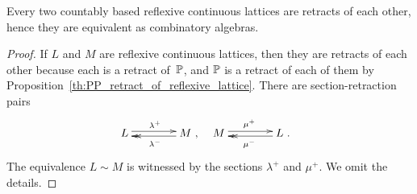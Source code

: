 \begin{corollary}
  \label{th:reflexive_lattices_equivalent}%
  Every two countably based reflexive continuous lattices are retracts 
  of each other, hence they are equivalent as combinatory algebras.
\end{corollary}

\begin{proof}
  If $L$ and $M$ are reflexive continuous lattices, then they are
  retracts of each other because each is a retract of~$\mathbb{P}$, and $\mathbb{P}$
  is a retract of each of them by
  Proposition~\ref{th:PP_retract_of_reflexive_lattice}.  There are
  section-retraction pairs
  \begin{align*}
    &\xymatrix@+1.5em{
      L \ar@<0.5ex>[r]^{\lambda^{+}} &
      M \ar@{->>}@<0.5ex>[l]^{\lambda^{-}}
      },
    &
    &\xymatrix@+1.5em{
      M \ar@<0.5ex>[r]^{\mu^{+}} &
      L \ar@{->>}@<0.5ex>[l]^{\mu^{-}}
      }.
  \end{align*}
  The equivalence $L \sim M$ is witnessed by the sections
  $\lambda^{+}$ and $\mu^{+}$. We omit the details.
\end{proof}


